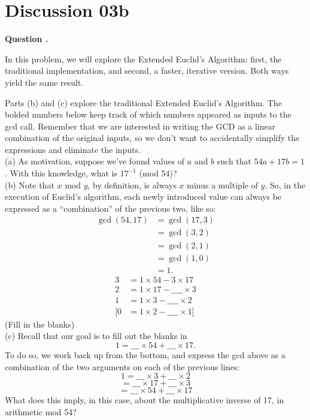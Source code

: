 \documentclass[12pt]{article}
\newcounter{questionnumber}
\newenvironment{question}[1][]{\stepcounter{questionnumber}\par\noindent\textbf{Question \thequestionnumber. #1}\par}{\par}
\begin{document}
\section{Discussion 03b}
\begin{question}
    In this problem, we will explore the Extended Euclid's Algorithm: first, the traditional implementation, and second, a faster, iterative version. Both ways yield the same result.

    Parts (b) and (c) explore the traditional Extended Euclid's Algorithm. The bolded numbers below keep track of which numbers appeared as inputs to the gcd call. Remember that we are interested in writing the GCD as a linear combination of the original inputs, so we don't want to accidentally simplify the expressions and eliminate the inputs.\\
    (a) As motivation, suppose we've found values of $a$ and $b$ such that $54a + 17b = 1$. With this knowledge, what is $17^{-1}$ (mod 54)?\\
    (b) Note that $x$ mod $y$, by definition, is always $x$ minus a multiple of $y$. So, in the execution of Euclid's algorithm, each newly introduced value can always be expressed as a ``combination'' of the previous two, like so:
    $$\begin{aligned}
    \gcd(54, 17) &= \gcd(17, 3) \\
    &= \gcd(3, 2) \\
    &= \gcd(2, 1) \\
    &= \gcd(1, 0) \\
    &= 1.
    \end{aligned}$$
    $$\begin{aligned}
    3 &= 1 \times 54 - 3 \times 17 \\
    2 &= 1 \times 17 - \_\_\_\_\times 3 \\
    1 &= 1 \times 3 - \_\_\_\_\times 2 \\
    [0 &= 1 \times 2 - \_\_\_\_\times 1]
    \end{aligned}$$
    (Fill in the blanks)\\
    (c) Recall that our goal is to fill out the blanks in
    $$1 = \_\_\_\times 54 + \_\_\_\times 17.$$
    To do so, we work back up from the bottom, and express the gcd above as a combination of the two arguments on each of the previous lines:
    $$
    1 = \_\_\_\times 3 + \_\_\_\times 2$$
    $$= \_\_\_\times 17 + \_\_\_\times 3$$
    $$
    = \_\_\_\times 54 + \_\_\_\times 17$$
    What does this imply, in this case, about the multiplicative inverse of 17, in arithmetic mod 54?\\

\end{question}
\end{document}
